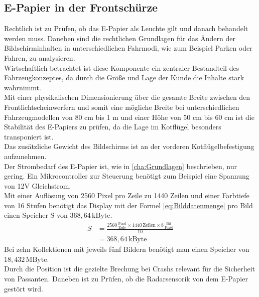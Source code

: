 \subsection{E-Papier in der Frontschürze}
Rechtlich ist zu Prüfen, ob das E-Papier als Leuchte gilt und danach behandelt werden muss. Daneben sind die rechtlichen Grundlagen für das Ändern der Bildschirminhalten in unterschiedlichen Fahrmodi, wie zum Beispiel Parken oder Fahren, zu analysieren. \\
Wirtschaftlich betrachtet ist diese Komponente ein zentraler Bestandteil des Fahrzeugkonzeptes, da durch die Größe und Lage der Kunde die Inhalte stark wahrnimmt. \\
Mit einer physikalischen Dimensionierung über die gesamte Breite zwischen den Frontlichtscheinwerfern und somit eine mögliche Breite bei unterschiedlichen Fahrzeugmodellen von 80 cm bis 1 m und einer Höhe von 50 cm bis 60 cm ist die Stabilität des E-Papiers zu prüfen, da die Lage im Kotflügel besonders transponiert ist. \\ 
Das zusätzliche Gewicht des Bildschirms ist an der vorderen Kotflügelbefestigung aufzunehmen.\\
Der Strombedarf des E-Papier ist, wie in \ref{cha:Grundlagen} beschrieben, nur gering. Ein Mikrocontroller zur Steuerung benötigt zum Beispiel eine Spannung von 12V Gleichstrom. \\
Mit einer Auflösung von 2560 Pixel pro Zeile zu 1440 Zeilen und einer Farbtiefe von 16 Stufen benötigt das Display mit der Formel \ref{eq:Bilddatenmenge} pro Bild einen Speicher S von $ 368,64\,\mathrm{kByte} $. 
\begin{align}
	S &= \frac{2560\,\frac{\mathrm{Pixel}}{\mathrm{Zeile}}\times 1440\,\mathrm{Zeilen} \times 8\,\frac{\mathrm{Bit}}{\mathrm{Pixel}}}{10} \\
	&=  368,64\,\mathrm{kByte}
\end{align}
Bei zehn Kollektionen mit jeweils fünf Bildern benötigt man einen Speicher von $ 18,432\,\mathrm{MByte} $. \\
Durch die Position ist die gezielte Brechung bei Crashs relevant für die Sicherheit von Passanten.
Daneben ist zu Prüfen, ob die Radarsensorik von dem E-Papier gestört wird.\\
